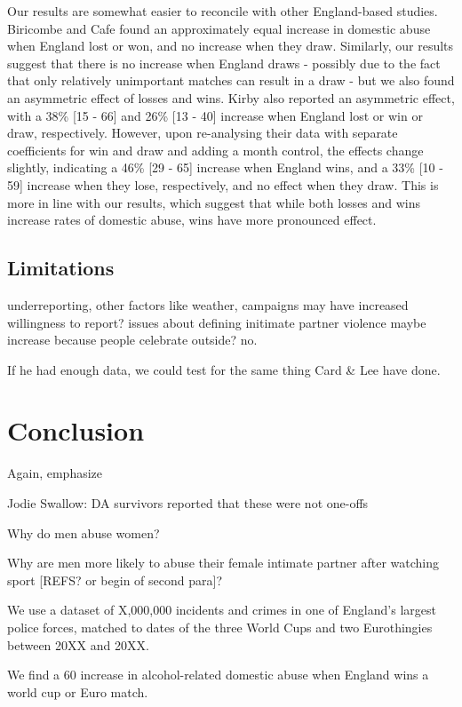 \documentclass[12pt, letterpaper]{article}
\begin{document}
Our results are somewhat easier to reconcile with other England-based studies. Biricombe and Cafe found an approximately equal increase in domestic abuse when England lost or won, and no increase when they draw. Similarly, our results suggest that there is no increase when England draws - possibly due to the fact that only relatively unimportant matches can result in a draw - but we also found an asymmetric effect of losses and wins. Kirby also reported an asymmetric effect, with a 38\% [15 - 66] and 26\% [13 - 40] increase when England lost or win or draw, respectively. However, upon re-analysing their data with separate coefficients for win and draw and adding a month control, the effects change slightly, indicating a 46\% [29 - 65] increase when England wins, and a 33\% [10 - 59] increase when they lose, respectively, and no effect when they draw. This is more in line with our results, which suggest that while both losses and wins increase rates of domestic abuse, wins have more pronounced effect.




\subsection{Limitations}
underreporting, other factors like weather, campaigns may have increased willingness to report? issues about defining initimate partner violence
maybe increase because people celebrate outside? no.

If he had enough data, we could test for the same thing Card \& Lee have done.

\section{Conclusion}

Again, emphasize 

Jodie Swallow: DA survivors reported that these were not one-offs


Why do men abuse women?


Why are men more likely to abuse their female intimate partner after watching sport [REFS? or begin of second para]?

We use a dataset of X,000,000 incidents and crimes in one of England's largest police forces, matched to dates of the three World Cups and two Eurothingies between 20XX and 20XX.

We find a 60 increase in alcohol-related domestic abuse when England wins a world cup or Euro match. 
\end{document}
